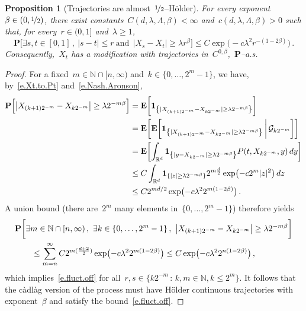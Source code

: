 \documentclass[11pt,twoside]{article} %
\numberwithin{equation}{section}
\newtheorem{proposition}[theorem]{Proposition}
\theoremstyle{definition}
\let\originalleft\left
\let\originalright\right
\renewcommand{\left}{\mathopen{}\mathclose\bgroup\originalleft}
\renewcommand{\right}{\aftergroup\egroup\originalright}
\newcommand*{\N}{\ensuremath{\mathbb{N}}}
\newcommand*{\Rd}{\ensuremath{\mathbb{R}^d}}
\newcommand{\indc}{\boldsymbol{1}}
\begin{document}
\begin{proposition}[Trajectories are almost~$\nicefrac12$--H\"older]
\label{p.Holder.trajectories}
\hspace{0.1pt} For every exponent~$\beta \in (0,\nicefrac12)$, there exist constants~$C(d,\lambda,\Lambda,\beta)<\infty$ and~$c(d,\lambda,\Lambda,\beta) > 0$ such that, for every~$r\in (0,1]$ and~$\lambda\geq 1$,
\begin{equation}
\label{e.fluct.off}
\mathbf{P} 
\biggl[
\exists s,t \in [0,1]\,, 
\ |s-t|\leq r 
\ \mbox{and} \  
\ 
\bigl| X_{s} - X_{t} \bigr| 
\geq 
\lambda
r^\beta
\biggr]
\leq 
C \exp \bigl( - c\lambda^2 r^{-(1-2\beta)} \bigr)\,.
\end{equation}
Consequently,~$X_t$ has a modification with trajectories in~$C^{0,\beta}$,~$\mathbf{P}$--a.s.
\end{proposition}
\begin{proof}
For a fixed~$m \in \N \cap [n,\infty)$ and~$k \in \{0,\ldots,2^m-1\}$, we have, by~\eqref{e.Xt.to.Pt} and~\eqref{e.Nash.Aronson},
\begin{align*}
\mathbf{P} 
\Bigl[
\bigl| X_{(k+1)2^{-m}} - X_{k2^{-m}} \bigr| 
\geq \lambda 2^{-m\beta}  
\Bigr]
&
=
\mathbf{E}
\biggl[
\indc_{
\left\{
| X_{(k+1)2^{-m}} - X_{k2^{-m}} | 
\geq \lambda 2^{-m\beta}   \right\}
}
\biggr]
\\ & 
=
\mathbf{E}
\biggl[
\mathbf{E}
\biggl[
\indc_{ \left\{
|X_{(k+1)2^{-m}} - X_{k2^{-m}}  |
\geq \lambda 2^{-m\beta}  \right\}
}
\, \bigg\vert\, 
\mathcal{G}_{k2^{-m}} 
\biggr] 
\biggr]
\\ & 
=
\mathbf{E}
\biggl[
\int_{\Rd} 
\indc_{ \left \{ | y - X_{k2^{-m}} | 
\geq \lambda 2^{-m\beta} \right \}}
P(t,X_{k2^{-m}},y)\,dy
\biggr]\\ & 
\leq
C
\int_{\Rd} 
\indc_{ \left \{ |z|\geq \lambda 2^{-m\beta} \right\}}
2^{m\frac d2} 
\exp\bigl( -c 2^m |z|^2 \bigr) \,dz
\\ & 
\leq 
C 2^{md/2} \exp \bigl( - c\lambda^2 2^{m(1-2\beta)} \bigr)
\,.
\end{align*}
A union bound (there are~$2^m$ many elements in~$\{ 0,\ldots,2^m-1\}$) therefore yields
\begin{align*}
&
\mathbf{P} 
\biggl[
\exists m \in \N \cap [n,\infty)\,, \ \exists k \in \{0,\ldots,2^m-1\}\,, 
\  
\bigl| X_{(k+1)2^{-m}} - X_{k2^{-m}} \bigr| 
\geq \lambda2^{-m\beta}  
\biggr]
\notag \\ & \qquad
\leq 
\sum_{m=n}^\infty
C 2^{m( \frac{d+2}{2}) } \exp \bigl( - c\lambda^2 2^{m(1-2\beta)} \bigr)
\leq 
C \exp \bigl( - c \lambda^2 2^{n(1-2\beta)} \bigr)\,,
\end{align*}
which implies~\eqref{e.fluct.off} for all~$r,s \in \{ k2^{-m} \,:\, k,m\in\N, k\leq 2^m\}$.
It follows that the c\`adl\`ag version of the process must have H\"older continuous trajectories with exponent~$\beta$ and satisfy the bound~\eqref{e.fluct.off}.
\end{proof}
\end{document}
